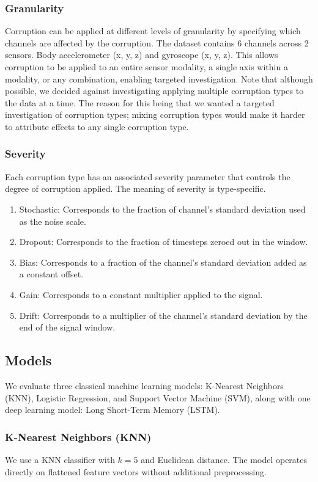 \subsubsection{Granularity}
Corruption can be applied at different levels of granularity by specifying which channels are
affected by the corruption. The dataset contains 6 channels across 2 sensors. Body accelerometer
(x, y, z) and gyroscope (x, y, z). This allows corruption to be applied to an entire sensor
modality, a single axis within a modality, or any combination, enabling targeted investigation.
Note that although possible, we decided against investigating applying multiple corruption types
to the data at a time. The reason for this being that we wanted a targeted investigation of corruption
types; mixing corruption types would make it harder to attribute effects to any single corruption type.

\subsubsection{Severity}
Each corruption type has an associated severity parameter that controls the degree of corruption
applied. The meaning of severity is type-specific.

\begin{enumerate}
    \item Stochastic: Corresponds to the fraction of channel's standard deviation used as the noise
        scale.
    \item Dropout: Corresponds to the fraction of timesteps zeroed out in the window.
    \item Bias: Corresponds to a fraction of the channel's standard deviation added as a constant
        offset.
    \item Gain: Corresponds to a constant multiplier applied to the signal.
    \item Drift: Corresponds to a multiplier of the channel's standard deviation by the end of the
        signal window.
\end{enumerate}

\subsection{Models}
We evaluate three classical machine learning models: K-Nearest Neighbors (KNN), Logistic Regression,
and Support Vector Machine (SVM), along with one deep learning model: Long Short-Term Memory (LSTM).

\subsubsection{K-Nearest Neighbors (KNN)}
We use a KNN classifier with $k=5$ and Euclidean distance. The model operates directly on flattened feature vectors without additional preprocessing.

